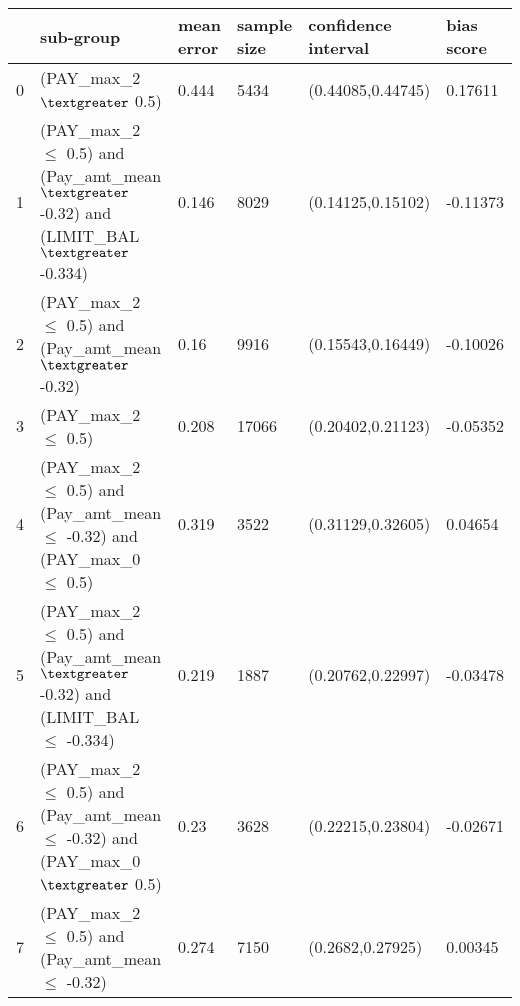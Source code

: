 \begin{tabular}{llllll}
\toprule
{} &                                                                sub-group & mean error & sample size & confidence interval & bias score \\
\midrule
0 &                                                        (PAY\_max\_2 $\textgreater$ 0.5) &      0.444 &        5434 &   (0.44085,0.44745) &    0.17611 \\
1 &   (PAY\_max\_2 $\leq$ 0.5) and (Pay\_amt\_mean $\textgreater$ -0.32) and (LIMIT\_BAL $\textgreater$ -0.334) &      0.146 &        8029 &   (0.14125,0.15102) &   -0.11373 \\
2 &                            (PAY\_max\_2 $\leq$ 0.5) and (Pay\_amt\_mean $\textgreater$ -0.32) &       0.16 &        9916 &   (0.15543,0.16449) &   -0.10026 \\
3 &                                                       (PAY\_max\_2 $\leq$ 0.5) &      0.208 &       17066 &   (0.20402,0.21123) &   -0.05352 \\
4 &    (PAY\_max\_2 $\leq$ 0.5) and (Pay\_amt\_mean $\leq$ -0.32) and (PAY\_max\_0 $\leq$ 0.5) &      0.319 &        3522 &   (0.31129,0.32605) &    0.04654 \\
5 &  (PAY\_max\_2 $\leq$ 0.5) and (Pay\_amt\_mean $\textgreater$ -0.32) and (LIMIT\_BAL $\leq$ -0.334) &      0.219 &        1887 &   (0.20762,0.22997) &   -0.03478 \\
6 &     (PAY\_max\_2 $\leq$ 0.5) and (Pay\_amt\_mean $\leq$ -0.32) and (PAY\_max\_0 $\textgreater$ 0.5) &       0.23 &        3628 &   (0.22215,0.23804) &   -0.02671 \\
7 &                           (PAY\_max\_2 $\leq$ 0.5) and (Pay\_amt\_mean $\leq$ -0.32) &      0.274 &        7150 &    (0.2682,0.27925) &    0.00345 \\
\bottomrule
\end{tabular}
